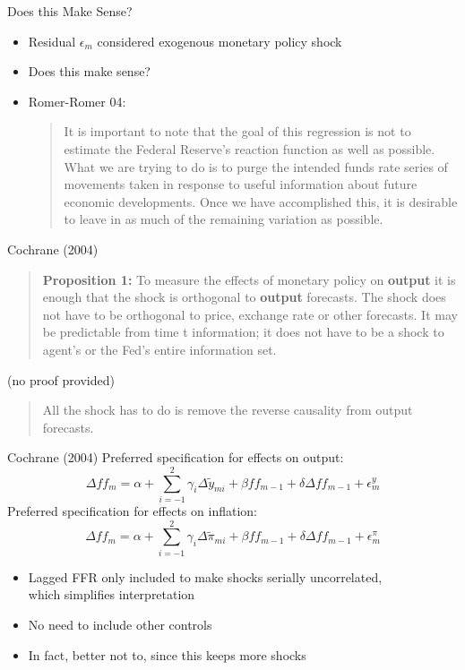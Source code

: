 \documentclass[11pt,aspectratio=169,xcolor={dvipsnames},hyperref={pdftex,pdfpagemode=UseNone,hidelinks,pdfdisplaydoctitle=true},usepdftitle=false]{beamer}
\begin{document}
\begin{frame}{Does this Make Sense?}
\begin{itemize}
\item Residual $\epsilon_{m}$ considered exogenous monetary policy shock
\item Does this make sense? \pause
\item Romer-Romer 04:

\medskip
\begin{quote}
It is important to note that the goal of this regression is not to estimate the Federal Reserve's reaction function as well as possible. What we are trying to do is to purge the intended funds rate series of movements taken in response to useful information about future economic developments. Once we have accomplished this, it is desirable to leave in as much of the remaining variation as possible.
\end{quote}
\end{itemize}
\end{frame}

\begin{frame}{Cochrane (2004)}
\begin{quote}
\textbf{Proposition 1:} To measure the effects of monetary policy on \textbf{output} it is enough that the shock is orthogonal to \textbf{output} forecasts. The shock does not have to be orthogonal to price, exchange rate or other forecasts. It may be predictable from time t information; it does not have to be a shock to agent's or the Fed's entire information set.
\end{quote}
(no proof provided)

\vspace{10pt}
\begin{quote}
All the shock has to do is remove the reverse causality from output forecasts.
\end{quote}
\end{frame}


\begin{frame}{Cochrane (2004)}
Preferred specification for effects on output:
\[\Delta ff_{m} = \alpha + \sum_{i=-1}^{2} \gamma_{i} \Delta \tilde{y}_{mi}  + \beta ff_{m-1} + \delta \Delta ff_{m-1} + \epsilon_{m}^{y} \]
Preferred specification for effects on inflation:
\[\Delta ff_{m} = \alpha + \sum_{i=-1}^{2} \gamma_{i} \Delta \tilde{\pi}_{mi}  + \beta ff_{m-1} + \delta \Delta ff_{m-1} + \epsilon_{m}^{\pi} \] \vspace{-10pt} \pause

\begin{itemize}
	\item Lagged FFR only included to make shocks serially uncorrelated, \\ which simplifies interpretation \pause
	\item No need to include other controls
	\item In fact, better not to, since this keeps more shocks
\end{itemize}
\end{frame}
\end{document}
